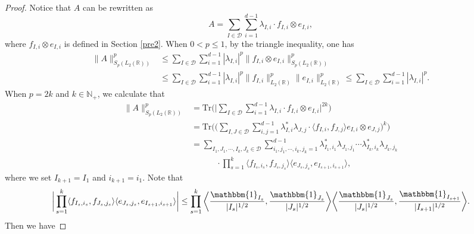 \documentclass[oneside,english,a4wide]{amsart}
\numberwithin{equation}{section}
\numberwithin{figure}{section}
\theoremstyle{plain}
\theoremstyle{plain}
\theoremstyle{definition}
\theoremstyle{plain}
\theoremstyle{remark}
\theoremstyle{definition}
\theoremstyle{remark}
\theoremstyle{definition}
\newcommand{\8}{\infty}
\begin{document}
\begin{proof}
	Notice that $A$ can be rewritten as 
	$$A=\sum_{I\in \mathcal{D}}\sum_{i=1}^{d-1}\lambda_{I,i}\cdot f_{I,i}\otimes e_{I,i},$$
	where $f_{I,i}\otimes e_{I,i}$ is defined in Section \ref{pre2}. When $0<p\le 1$, by the triangle inequality, one has
	\begin{equation*}
		\begin{aligned}
			\|A\|^p_{S_p(L_2(\mathbb{R}))}{}&\le \sum_{I\in\mathcal{D}}\sum_{i=1}^{d-1} |\lambda_{I,i}|^p\|f_{I,i}\otimes e_{I,i}\|^p_{S_p(L_2(\mathbb{R}))}\\
			&\leq \sum_{I\in\mathcal{D}}\sum_{i=1}^{d-1} |\lambda_{I,i}|^p\|f_{I,i}\|^p_{L_2(\mathbb{R})}\|e_{I,i}\|^p_{L_2(\mathbb{R})}\le\sum_{I\in\mathcal{D}}\sum_{i=1}^{d-1} |\lambda_{I,i}|^p.
		\end{aligned}
	\end{equation*}
	When $p=2k$ and $k\in\mathbb{N}_+$, we calculate that
	\begin{equation}\label{mp}
		\begin{aligned}
			\|A\|^p_{S_p(L_2(\mathbb{R}))}
			&=\mathrm{Tr} \biggl(\Big|\sum_{I\in\mathcal{D}}\sum_{i=1}^{d-1}\lambda_{I,i}\cdot f_{I,i}\otimes e_{I,i}\Big|^{2k}\biggr)\\
			&=\mathrm{Tr} \biggl(\Big(\sum_{I,J\in\mathcal{D}}\sum_{i,j=1}^{d-1}\lambda_{I,i}^*\lambda_{J,j}\cdot \langle f_{I,i},f_{J,j}\rangle e_{I,i}\otimes e_{J,j}\Big)^{k}\biggr)\\
			&=\sum_{I_1,J_1,\cdots,I_k,J_k\in\mathcal{D}}\sum_{ i_1,j_1,\cdots,i_k,j_k=1}^{d-1} \lambda_{I_1,i_1}^*\lambda_{J_1,j_1}\cdots \lambda_{I_k,i_k}^*\lambda_{J_k,j_k} \\
			&\quad\quad\quad\cdot\prod_{s=1}^k \langle f_{I_s,i_s},f_{J_s,j_s}\rangle \langle e_{J_s,j_s},e_{I_{s+1},i _{s+1}}\rangle,
		\end{aligned}
	\end{equation}
	where we set $I_{k+1}=I_1$ and $i_{k+1}=i_1$. Note that 
	\begin{equation*}
		\begin{aligned}
			\bigg|\prod_{s=1}^k \langle f_{I_s,i_s},f_{J_s,j_s}\rangle \langle e_{J_s,j_s},e_{I_{s+1},i_{s+1}}\rangle\bigg|\le \prod_{s=1}^k \bigg\langle \frac{\mathbbm{1}_{I_s}}{|I_s|^{1/2}},\frac{\mathbbm{1}_{J_s}}{|J_s|^{1/2}}\bigg\rangle \bigg\langle \frac{\mathbbm{1}_{J_s}}{|J_s|^{1/2}},\frac{\mathbbm{1}_{I_{s+1}}}{|I_{s+1}|^{1/2}}\bigg\rangle.
		\end{aligned}
	\end{equation*}
	Then we have

\end{proof}
\end{document}

